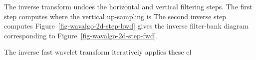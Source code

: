 The inverse transform undoes the horizontal and vertical filtering steps.
The first step computes
where the vertical up-sampling is
The second inverse step computes
Figure~\ref{fig-wavalgo-2d-step-bwd} gives the inverse filter-bank diagram corresponding to Figure~\ref{fig-wavalgo-2d-step-fwd}.


The inverse fast wavelet transform iteratively applies these el